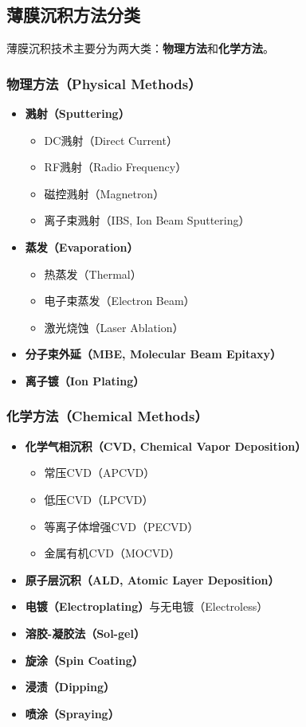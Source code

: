 \documentclass[UTF8,12pt,a4paper]{ctexart}
\begin{document}
\subsection{薄膜沉积方法分类}

薄膜沉积技术主要分为两大类：\textbf{物理方法}和\textbf{化学方法}。

\subsubsection{物理方法（Physical Methods）}

\begin{itemize}
    \item \textbf{溅射（Sputtering）}
    \begin{itemize}
        \item DC溅射（Direct Current）
        \item RF溅射（Radio Frequency）
        \item 磁控溅射（Magnetron）
        \item 离子束溅射（IBS, Ion Beam Sputtering）
    \end{itemize}
    \item \textbf{蒸发（Evaporation）}
    \begin{itemize}
        \item 热蒸发（Thermal）
        \item 电子束蒸发（Electron Beam）
        \item 激光烧蚀（Laser Ablation）
    \end{itemize}
    \item \textbf{分子束外延（MBE, Molecular Beam Epitaxy）}
    \item \textbf{离子镀（Ion Plating）}
\end{itemize}

\subsubsection{化学方法（Chemical Methods）}

\begin{itemize}
    \item \textbf{化学气相沉积（CVD, Chemical Vapor Deposition）}
    \begin{itemize}
        \item 常压CVD（APCVD）
        \item 低压CVD（LPCVD）
        \item 等离子体增强CVD（PECVD）
        \item 金属有机CVD（MOCVD）
    \end{itemize}
    \item \textbf{原子层沉积（ALD, Atomic Layer Deposition）}
    \item \textbf{电镀（Electroplating）}与无电镀（Electroless）
    \item \textbf{溶胶-凝胶法（Sol-gel）}
    \item \textbf{旋涂（Spin Coating）}
    \item \textbf{浸渍（Dipping）}
    \item \textbf{喷涂（Spraying）}
\end{itemize}
\end{document}
